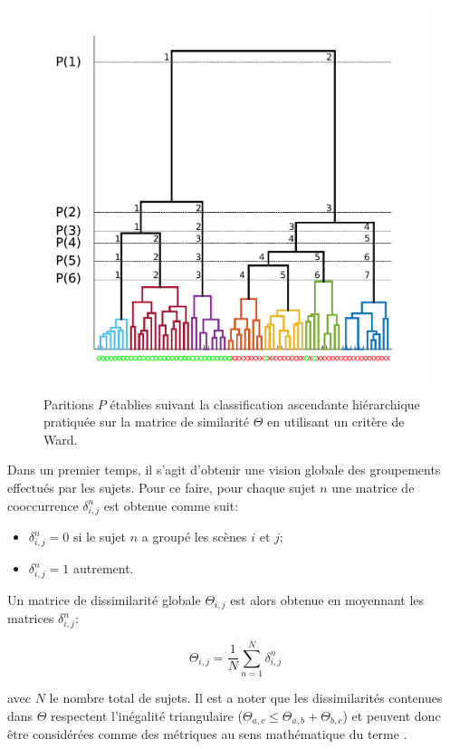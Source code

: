 \begin{figure}[t]
        \myfloatalign
        \includegraphics[width=.8\linewidth]{gfx/ch_5/dendrogram}
        \caption{Paritions $P$ établies suivant la classification ascendante hiérarchique pratiquée sur la matrice de similarité $\Theta$ en utilisant un critère de Ward.}\label{fig:dendrogram}
\end{figure}

Dans un premier temps, il s'agit d'obtenir une vision globale des groupements effectués par les sujets. Pour ce faire, pour chaque sujet $n$ une matrice de cooccurrence $\delta^n_{i,j}$ est obtenue comme suit:

\begin{itemize}
\item $\delta^n_{i,j}=0$ si le sujet $n$ a groupé les scènes $i$ et $j$;
\item $\delta^n_{i,j}=1$ autrement.
\end{itemize}

Un matrice de dissimilarité globale $\Theta_{i,j}$ est alors obtenue en moyennant les matrices $\delta^n_{i,j}$:

\begin{equation}
\Theta_{i,j}= \dfrac{1}{N} \sum_{n=1}^{N}  \delta^n_{i,j}
\end{equation}

avec $N$ le nombre total de sujets. Il est a noter que les dissimilarités contenues dans $\Theta$ respectent l'inégalité triangulaire ($\Theta_{a,c}\leq\Theta_{a,b}+\Theta_{b,c}$) et peuvent donc être considérées comme des métriques au sens mathématique du terme \citep{parizet2012application}. 

